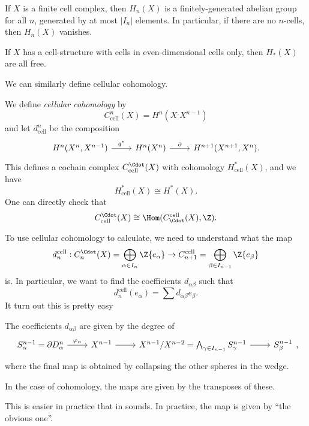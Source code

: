 \documentclass[a4paper]{article}
\begin{document}
\begin{prop}
  If $X$ is a finite cell complex, then $H_n(X)$ is a finitely-generated abelian group for all $n$, generated by at most $|I_n|$ elements. In particular, if there are no $n$-cells, then $H_n(X)$ vanishes.

  If $X$ has a cell-structure with cells in even-dimensional cells only, then $H_*(X)$ are all free.
\end{prop}

We can similarly define cellular cohomology.
\begin{defi}
  We define \emph{cellular cohomology} by
  \[
    C_{\mathrm{cell}}^n(X) = H^n(X^, X^{n - 1})
  \]
  and let $d_{\mathrm{cell}}^n$ be the composition
  \[
    \begin{tikzcd}
      H^n(X^n, X^{n - 1}) \ar[r, "q^*"] & H^n(X^n) \ar[r, "\partial"] & H^{n + 1}(X^{n + 1}, X^n).
    \end{tikzcd}
  \]
  This defines a cochain complex $C_{\mathrm{cell}}^\Cdot(X)$ with cohomology $H^*_{\mathrm{cell}}(X)$, and we have
  \[
    H_{\mathrm{cell}}^*(X) \cong H^*(X).
  \]
  One can directly check that
  \[
    C_{\mathrm{cell}}^\Cdot(X) \cong \Hom (C_\Cdot^{\mathrm{cell}}(X), \Z).
  \]
\end{defi}

To use cellular cohomology to calculate, we need to understand what the map
\[
  d_n^{\mathrm{cell}} : C_n^\Cdot(X) = \bigoplus_{\alpha \in I_n} \Z\{e_\alpha\} \to C_{n + 1}^{\mathrm{cell}} = \bigoplus_{\beta \in I_{n - 1}}\Z\{e_\beta\}
\]
is. In particular, we want to find the coefficients $d_{\alpha\beta}$ such that
\[
  d_n^{\mathrm{cell}}(e_\alpha) = \sum d_{\alpha\beta} e_\beta.
\]
It turn out this is pretty easy
\begin{lemma}
  The coefficients $d_{\alpha\beta}$ are given by the degree of
  \[
    \begin{tikzcd}
      S_\alpha^{n - 1} = \partial D_\alpha^n \ar[r, "\varphi_\alpha"] & X^{n - 1} \ar[r] & X^{n - 1}/X^{n - 2} = \bigwedge_{\gamma \in I_{n - 1}} S_\gamma^{n - 1} \ar[r] & S_\beta^{n - 1}
    \end{tikzcd},
  \]
  where the final map is obtained by collapsing the other spheres in the wedge.

  In the case of cohomology, the maps are given by the transposes of these.
\end{lemma}
This is easier in practice that in sounds. In practice, the map is given by ``the obvious one''.
\end{document}
